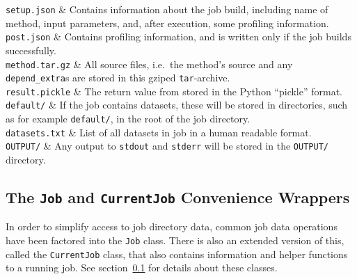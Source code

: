 \starttabletwo

\texttt{setup.json} & Contains information about the job build,
including name of method, input parameters, and, after execution, some
profiling information.\\

\texttt{post.json} & Contains profiling information, and is written
only if the job builds successfully.\\

\texttt{method.tar.gz} & All source files, i.e.\ the method's source
and any \texttt{depend\_extra}s are stored in this gziped
\texttt{tar}-archive.\\

\texttt{result.pickle} & The return value from \synthesis stored in the
Python ``pickle'' format.\\

\texttt{default/} & If the job contains datasets, these will be stored
in directories, such as for example \texttt{default/}, in the root of
the job directory.\\

\texttt{datasets.txt} & List of all datasets in job in a human
readable format.\\

\texttt{OUTPUT/} & Any output to \texttt{stdout} and \texttt{stderr} will be
stored in the \texttt{OUTPUT/} directory.\\
\stoptabletwo


\subsection{The \texttt{Job} and \texttt{CurrentJob} Convenience Wrappers}
In order to simplify access to job directory data, common job data
operations have been factored into the \texttt{Job} class.  There is
also an extended version of this, called the \texttt{CurrentJob}
class, that also contains information and helper functions to a
running job.  See section~\ref{} for details about these classes.



